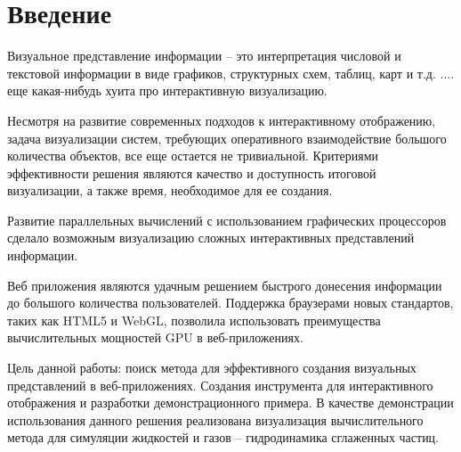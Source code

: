\newpage
\section*{Введение}



Визуальное представление информации -- это интерпретация числовой и текстовой
информации в виде графиков, структурных схем, таблиц, карт и т.д.
.... еще какая-нибудь хуита про интерактивную визуализацию.

Несмотря на развитие современных подходов к интерактивному отображению, задача
визуализации систем, требующих оперативного взаимодействие большого количества
объектов, все еще остается не тривиальной. Критериями эффективности решения
являются качество и доступность итоговой визуализации, а также время, необходимое
для ее создания.

Развитие параллельных вычислений с использованием графических процессоров сделало 
возможным визуализацию сложных интерактивных представлений информации. 

Веб приложения являются удачным решением быстрого донесения информации до большого
количества пользователей. Поддержка браузерами новых стандартов, таких как HTML5 и WebGL,  
позволила использовать преимущества вычислительных мощностей GPU в веб-приложениях.

Цель данной работы: поиск метода для эффективного создания визуальных представлений 
в веб-приложениях. Создания инструмента для интерактивного отображения и разработки
демонстрационного примера. В качестве демонстрации использования данного решения реализована 
визуализация вычислительного метода для симуляции жидкостей и газов -- гидродинамика 
сглаженных частиц.


